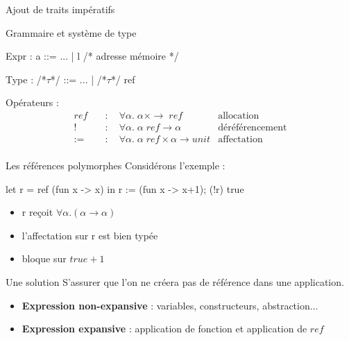 \documentclass[xcolor={table,dvipsnames}]{beamer}
\begin{document}
\begin{frame}[fragile]{Ajout de traits impératifs}
\begin{block}{Grammaire et système de type}
\begin{OCaml}
Expr : a ::= ... | l      /* adresse mémoire */ 
\end{OCaml}
\begin{OCaml}
Type : /*$\tau$*/ ::= ... | /*$\tau$*/ ref
\end{OCaml}
\end{block}
\pause

Opérateurs :
\begin{align*}
  ref \quad &: \quad \forall \alpha. \; \alpha \times \rightarrow \; ref  &\textrm{allocation}\\
  ! \quad &: \quad  \forall \alpha. \; \alpha \; ref \rightarrow \alpha  &\textrm{déréférencement}\\
  := \quad &:  \quad  \forall \alpha. \; \alpha \; ref \times \alpha \rightarrow unit  &\textrm{affectation}\\
\end{align*}
\end{frame}





\begin{frame}[fragile]{Les références polymorphes}
Considérons l'exemple :
\begin{center}
\begin{OCaml}
let r = ref (fun x -> x) in
   r := (fun x -> x+1);
  (!r) true
\end{OCaml}
\end{center}

\begin{itemize}
\pause
\item r reçoit $\forall \alpha. (\alpha \rightarrow \alpha)$
\pause
\item l'affectation sur r est bien typée
\pause
\item bloque sur $true+1$
\end{itemize}
\end{frame}



\begin{frame}

\begin{block}{Une solution}
S’assurer que l’on ne créera pas de référence dans une application. 
\end{block}

\bigskip

\begin{itemize}
\pause
\item \textbf{Expression non-expansive} : variables, constructeurs, abstraction... 
\pause
\bigskip
\item \textbf{Expression expansive} : application de fonction et application de $ref$
\end{itemize}
\end{frame}
\end{document}
